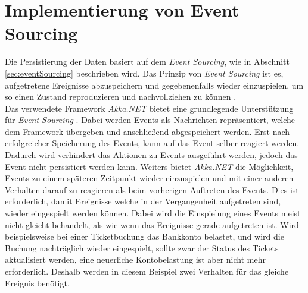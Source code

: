 \section{Implementierung von Event Sourcing}
\label{sec:implementation:eventSouring}
Die Persistierung der Daten basiert auf dem \textit{Event Sourcing}, wie in Abschnitt \ref{sec:eventSourcing} beschrieben wird. Das Prinzip von \textit{Event Sourcing} ist es, aufgetretene Ereignisse abzuspeichern und gegebenenfalls wieder einzuspielen, um so einen Zustand reproduzieren und nachvollziehen zu können \citep{betts2013CQRSEventSourcing}. \\
Das verwendete Framework \textit{Akka.NET} bietet eine grundlegende Unterstützung für \textit{Event Sourcing} \citep{Akka.NETCommunityAkka.NETDocumentation}. Dabei werden Events als Nachrichten repräsentiert, welche dem Framework übergeben und anschließend abgespeichert werden. 
Erst nach erfolgreicher Speicherung des Events, kann auf das Event selber reagiert werden. Dadurch wird verhindert das Aktionen zu Events ausgeführt werden, jedoch das Event nicht persistiert werden kann. Weiters bietet \textit{Akka.NET} die Möglichkeit, Events zu einem späteren Zeitpunkt wieder einzuspielen und mit einer anderen Verhalten darauf zu reagieren als beim vorherigen Auftreten des Events. Dies ist erforderlich, damit Ereignisse welche in der Vergangenheit aufgetreten sind, wieder eingespielt werden können. Dabei wird die Einspielung eines Events meist nicht gleicht behandelt, als wie wenn das Ereignisse gerade aufgetreten ist. Wird beispielsweise bei einer Ticketbuchung das Bankkonto belastet, und wird die Buchung nachträglich wieder eingespielt, sollte zwar der Status des Tickets aktualisiert werden, eine neuerliche Kontobelastung ist aber nicht mehr erforderlich. Deshalb werden in diesem Beispiel zwei Verhalten für das gleiche Ereignis benötigt.
